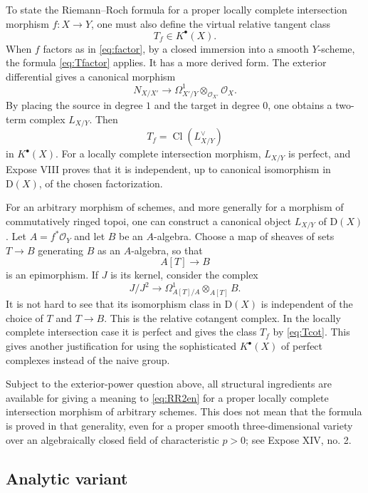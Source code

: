 \documentclass[14pt]{extarticle}
\newcommand{\cO}{\mathcal O}
\newcommand{\Cl}{\operatorname{Cl}}
\newcommand{\D}{\mathrm D}
\begin{document}
To state the Riemann--Roch formula for a proper locally complete intersection morphism $f:X\to Y$, one must also define the virtual relative tangent class
\[
   T_f\in K^{\bullet}(X).
\]
When $f$ factors as in \eqref{eq:factor}, by a closed immersion into a smooth $Y$-scheme, the formula \eqref{eq:Tfactor} applies. It has a more derived form. The exterior differential gives a canonical morphism
\begin{equation}\label{eq:conormalmap}
   N_{X/X'}\to \Omega^1_{X'/Y}\otimes_{\cO_{X'}}\cO_X.
\end{equation}
By placing the source in degree $1$ and the target in degree $0$, one obtains a two-term complex $L_{X/Y}$. Then
\begin{equation}\label{eq:Tcot}
   T_f=\Cl(L_{X/Y}^{\vee})
\end{equation}
in $K^{\bullet}(X)$. For a locally complete intersection morphism, $L_{X/Y}$ is perfect, and Expose VIII proves that it is independent, up to canonical isomorphism in $\D(X)$, of the chosen factorization.

For an arbitrary morphism of schemes, and more generally for a morphism of commutatively ringed topoi, one can construct a canonical object $L_{X/Y}$ of $\D(X)$. Let $A=f^*\cO_Y$ and let $B$ be an $A$-algebra. Choose a map of sheaves of sets $T\to B$ generating $B$ as an $A$-algebra, so that
\[
   A[T]\to B
\]
is an epimorphism. If $J$ is its kernel, consider the complex
\begin{equation}\label{eq:cotcomplex}
   J/J^2\to \Omega^1_{A[T]/A}\otimes_{A[T]}B.
\end{equation}
It is not hard to see that its isomorphism class in $\D(X)$ is independent of the choice of $T$ and $T\to B$. This is the relative cotangent complex. In the locally complete intersection case it is perfect and gives the class $T_f$ by \eqref{eq:Tcot}. This gives another justification for using the sophisticated $K^{\bullet}(X)$ of perfect complexes instead of the naive group.

Subject to the exterior-power question above, all structural ingredients are available for giving a meaning to \eqref{eq:RR2en} for a proper locally complete intersection morphism of arbitrary schemes. This does not mean that the formula is proved in that generality, even for a proper smooth three-dimensional variety over an algebraically closed field of characteristic $p>0$; see Expose XIV, no. 2.

\subsection{Analytic variant}
\end{document}
